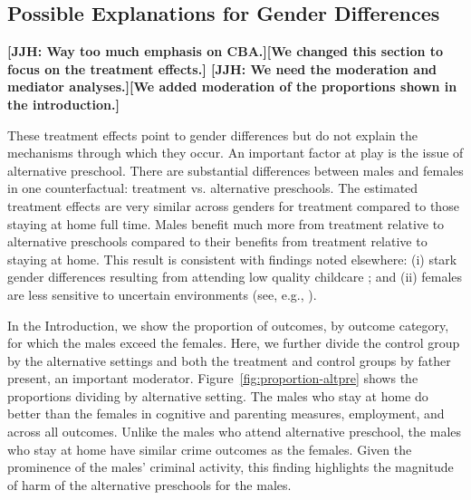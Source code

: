 \subsection{Possible Explanations for Gender Differences}

\textbf{[JJH: Way too much emphasis on CBA.][We changed this section to focus on the treatment effects.] [JJH: We need the moderation and mediator analyses.][We added moderation of the proportions shown in the introduction.]}

These treatment effects point to gender differences but do not explain the mechanisms through which they occur. An important factor at play is the issue of alternative preschool. There are substantial differences between males and females in one counterfactual: treatment vs. alternative preschools. The estimated treatment effects are very similar across genders for treatment compared to those staying at home full time. Males benefit much more from treatment relative to alternative preschools compared to their benefits from treatment relative to staying at home. This result is consistent with findings noted elsewhere: (i) stark gender differences resulting from attending low quality childcare \citep{Kottelenberg-Lehrer_2014_Gender-Effects,Baker_Gruber_Milligan_2015_Noncog_Defects}; and (ii) females are less sensitive to uncertain environments (see, e.g., \citealp{Autor-etal_2015_Family-Disadvantage}).

In the Introduction, we show the proportion of outcomes, by outcome category, for which the males exceed the females. Here, we further divide the control group by the alternative settings and both the treatment and control groups by father present, an important moderator. Figure~\ref{fig:proportion-altpre} shows the proportions dividing by alternative setting. The males who stay at home do better than the females in cognitive and parenting measures, employment, and across all outcomes. Unlike the males who attend alternative preschool, the males who stay at home have similar crime outcomes as the females. Given the prominence of the males' criminal activity, this finding highlights the magnitude of harm of the alternative preschools for the males. 

